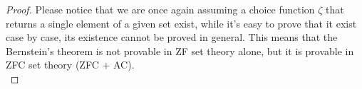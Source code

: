 \begin{proof}
    Please notice that we are once again assuming a choice function $\zeta$ that returns a single element of a given set exist, 
    while it's easy to prove that it exist case by case, its existence cannot be proved in general. This means that the 
    Bernstein's theorem is not provable in ZF set theory alone, but it is provable in ZFC set theory (ZFC + AC). \\

\end{proof}

\newpage
